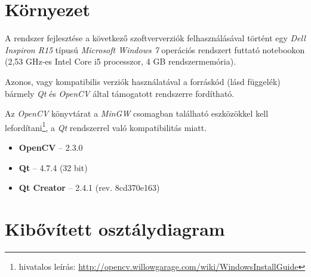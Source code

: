 \section{Környezet}\label{sect:telepites}

A rendszer fejlesztése a következő szoftververziók felhasználásával történt egy \emph{Dell Inspiron R15} típusú \emph{Microsoft Windows 7} operációs rendszert futtató notebookon (2,53 GHz-es Intel Core i5 processzor, 4 GB rendszermemória).

Azonos, vagy kompatibilis verziók használatával a forráskód (lásd  függelék) bármely \emph{Qt} és \emph{OpenCV} által támogatott rendszerre fordítható.

Az \emph{OpenCV} könyvtárat a \emph{MinGW} csomagban található eszközökkel kell lefordítani\footnote{hivatalos leírás: \url{http://opencv.willowgarage.com/wiki/WindowsInstallGuide}}, a \emph{Qt} rendszerrel való kompatibilitás miatt.  

\begin{itemize}
  \item \textbf{OpenCV} -- 2.3.0
  \item \textbf{Qt} -- 4.7.4 (32 bit)
  \item \textbf{Qt Creator} -- 2.4.1 (rev. 8cd370e163)
\end{itemize}

\newpage
\section{Kibővített osztálydiagram}\label{sect:osztalydiagram}

